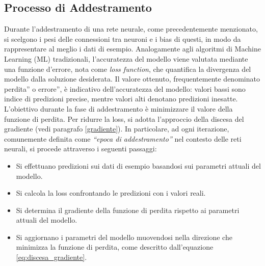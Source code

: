 \documentclass[12pt,a4paper,twoside,openright]{book}
\begin{document}
\subsection{Processo di Addestramento}
Durante l'addestramento di una rete neurale, come precedentemente menzionato, si scelgono i pesi delle connessioni tra neuroni e i bias di questi, in modo da rappresentare al meglio i dati di esempio. Analogamente agli algoritmi di Machine Learning (ML) tradizionali, l'accuratezza del modello viene valutata mediante una funzione d'errore, nota come \emph{loss function}, che quantifica la divergenza del modello dalla soluzione desiderata. Il valore ottenuto, frequentemente denominato perdita'' o errore'', è indicativo dell'accuratezza del modello: valori bassi sono indice di predizioni precise, mentre valori alti denotano predizioni inesatte. L'obiettivo durante la fase di addestramento è minimizzare il valore della funzione di perdita.
Per ridurre la loss, si adotta l'approccio della discesa del gradiente (vedi paragrafo \ref{gradiente}). In particolare, ad ogni iterazione, comunemente definita come \emph{``epoca di addestramento''} nel contesto delle reti neurali, si procede attraverso i seguenti passaggi:
\begin{itemize}
\item Si effettuano predizioni sui dati di esempio basandosi sui parametri attuali del modello.
\item Si calcola la loss confrontando le predizioni con i valori reali.
\item Si determina il gradiente della funzione di perdita rispetto ai parametri attuali del modello.
\item Si aggiornano i parametri del modello muovendosi nella direzione che minimizza la funzione di perdita, come descritto dall'equazione \ref{eq:discesa_gradiente}.
\end{itemize}
\end{document}
